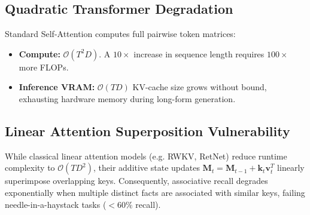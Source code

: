 \documentclass[11pt,a4paper]{article}
\begin{document}
\begin{table}[H]
\centering
\caption{Comprehensive asymptotic complexity and associative capacity comparison.}
\label{tab:complexity_comparison}
\end{table}

\subsection{Quadratic Transformer Degradation}
Standard Self-Attention computes full pairwise token matrices:
\begin{itemize}
    \item \textbf{Compute:} $\mathcal{O}(T^2 D)$. A $10\times$ increase in sequence length requires $100\times$ more FLOPs.
    \item \textbf{Inference VRAM:} $\mathcal{O}(T D)$ KV-cache size grows without bound, exhausting hardware memory during long-form generation.
\end{itemize}

\subsection{Linear Attention Superposition Vulnerability}
While classical linear attention models (e.g. RWKV, RetNet) reduce runtime complexity to $\mathcal{O}(T D^2)$, their additive state updates $\mathbf{M}_t = \mathbf{M}_{t-1} + \mathbf{k}_t \mathbf{v}_t^T$ linearly superimpose overlapping keys. Consequently, associative recall degrades exponentially when multiple distinct facts are associated with similar keys, failing needle-in-a-haystack tasks ($<60\%$ recall).
\end{document}

